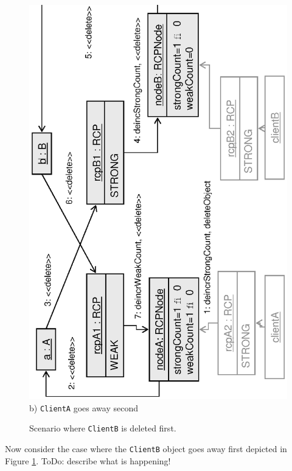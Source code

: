 \documentclass[pdf,ps2pdf,11pt]{SANDreport}
\begin{document}
{\begin{figure}
\begin{center}
\includegraphics*[angle=270,scale=0.65]{CircularRCP_A_B_ClientB_2}
\\[2ex] b) {}\texttt{ClientA} goes away second \\[3ex]
\end{center}
\caption{
\label{fig:CircularRCP_A_B_ClientB}
Scenario where {}\texttt{ClientB} is deleted first.  }
\end{figure}
\esinglespace}

Now consider the case where the {}\texttt{ClientB} object goes away
first depicted in Figure {}\ref{fig:CircularRCP_A_B_ClientB}.  ToDo:
describe what is happening!
\end{document}
